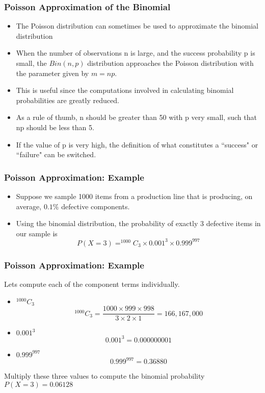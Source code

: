 \begin{frame}
\frametitle{Poisson Approximation of the Binomial}

\begin{itemize}
\item The Poisson distribution can sometimes be used to approximate the
binomial distribution
\item When the number of observations n is large, and the success probability
p is small, the $Bin(n,p)$ distribution approaches the Poisson distribution
with the parameter given by $m = np$.
\item This is useful since the computations involved in calculating binomial
probabilities are greatly reduced.
\item As a rule of thumb, n should be greater than 50 with p very small, such
that np should be less than 5.
\item If the value of p is very high, the definition of what constitutes a
``success" or ``failure" can be switched.
\end{itemize}
\end{frame}

\begin{frame}
\frametitle{Poisson Approximation: Example}

\begin{itemize}
\item Suppose we sample 1000 items from a production line that is producing, on
average, $0.1\%$ defective components.
\item Using the binomial distribution, the probability of exactly 3 defective items in
our sample is
\[P(X = 3) = ^{1000}C_{3} \times 0.001^{3} \times 0.999^{997}\]
\end{itemize}
\end{frame}

\begin{frame}
\frametitle{Poisson Approximation: Example}
Lets compute each of the component terms individually.

\begin{itemize}
\item $^{1000}C_{3}$
\[^{1000}C_{3} = \frac{1000 \times 999 \times 998}{3 \times 2 \times 1} = 166,167,000\]
\item $0.001^3$
\[0.001^3 = 0.000000001\]
\item $0.999^{997}$
\[0.999^{997} = 0.36880\]
\end{itemize}


Multiply these three values to compute the binomial probability
$P(X = 3) = 0.06128$
\end{frame}

